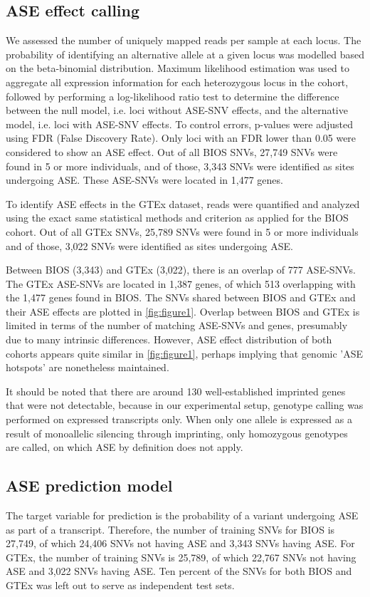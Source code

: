 \documentclass{book}
\begin{document}
\begin{refsection}
\subsection*{ASE effect calling}
We assessed the number of uniquely mapped reads per sample at each locus.
The probability of identifying an alternative allele at a given locus was modelled based on the beta-binomial distribution.
Maximum likelihood estimation was used to aggregate all expression information for each heterozygous locus in the cohort, followed by performing a log-likelihood ratio test to determine the difference between the null model, i.e. loci without ASE-SNV effects, and the alternative model, i.e. loci with ASE-SNV effects.
To control errors, p-values were adjusted using FDR (False Discovery Rate).
Only loci with an FDR lower than 0.05 were considered to show an ASE effect.
Out of all BIOS SNVs, 27,749 SNVs were found in 5 or more individuals, and of those, 3,343 SNVs were identified as sites undergoing ASE.
These ASE-SNVs were located in 1,477 genes.

To identify ASE effects in the GTEx dataset, reads were quantified and analyzed using the exact same statistical methods and criterion as applied for the BIOS cohort.
Out of all GTEx SNVs, 25,789 SNVs were found in 5 or more individuals and of those, 3,022 SNVs were identified as sites undergoing ASE.

Between BIOS (3,343) and GTEx (3,022), there is an overlap of 777 ASE-SNVs.
The GTEx ASE-SNVs are located in 1,387 genes, of which 513 overlapping with the 1,477 genes found in BIOS.
The SNVs shared between BIOS and GTEx and their ASE effects are plotted in \ref{fig:figure1}.
Overlap between BIOS and GTEx is limited in terms of the number of matching ASE-SNVs and genes, presumably due to many intrinsic differences.
However, ASE effect distribution of both cohorts appears quite similar in \ref{fig:figure1}, perhaps implying that genomic 'ASE hotspots' are nonetheless maintained.

It should be noted that there are around 130 well-established imprinted genes \cite{DeVeale2012Critical} that were not detectable, because in our experimental setup, genotype calling was performed on expressed transcripts only.
When only one allele is expressed as a result of monoallelic silencing through imprinting, only homozygous genotypes are called, on which ASE by definition does not apply.

\subsection*{ASE prediction model}
The target variable for prediction is the probability of a variant undergoing ASE as part of a transcript.
Therefore, the number of training SNVs for BIOS is 27,749, of which 24,406 SNVs not having ASE and 3,343 SNVs having ASE.
For GTEx, the number of training SNVs is 25,789, of which 22,767 SNVs not having ASE and 3,022 SNVs having ASE.
Ten percent of the SNVs for both BIOS and GTEx was left out to serve as independent test sets.


\end{refsection}
\end{document}
